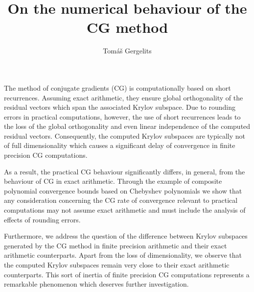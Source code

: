 \documentclass{article}
\title{On the numerical behaviour of the CG method}
\author{Tom{\'a}{\v s} Gergelits}
\affil{PhD student at Faculty of Mathematics and Physics, Charles University in Prague}
\date{}
\begin{document}
\maketitle
\setcounter{page}{10}
The method of conjugate gradients (CG) is computationally based on short recurrences. Assuming exact arithmetic, they ensure global orthogonality of the residual vectors which span the associated Krylov subspace. Due to rounding errors in practical computations, however, the use of short recurrences leads to the loss of the global orthogonality and even linear independence of the computed residual vectors. Consequently, the computed Krylov subspaces are typically not of full dimensionality which causes a significant delay of convergence in finite precision CG computations.

As a result, the practical CG behaviour significantly differs, in general, from the behaviour of CG in exact arithmetic. Through the example of composite polynomial convergence bounds based on Chebyshev polynomials we show that any consideration concerning the CG rate of convergence relevant to practical computations may not assume exact arithmetic and must include the analysis of effects of rounding errors.

Furthermore, we address the question of the difference between Krylov subspaces generated by the CG method in finite precision arithmetic and their exact arithmetic counterparts. Apart from the loss of dimensionality, we observe that  the computed Krylov subspaces remain very close to their exact arithmetic counterparts. This sort of inertia of finite precision CG computations represents a remarkable phenomenon which deserves further investigation.
\end{document}
